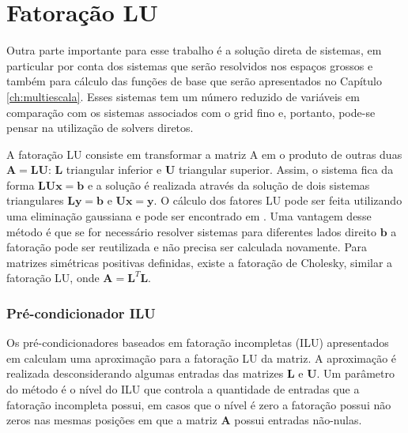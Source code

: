 \section{Fatoração LU} \label{sec:fatoracaolu}

Outra parte importante para esse trabalho é a solução direta de sistemas, em particular por conta dos sistemas que serão resolvidos nos espaços grossos e também para cálculo das funções de base que serão apresentados no Capítulo \ref{ch:multiescala}. Esses sistemas tem um número reduzido de variáveis em comparação com os sistemas associados com o grid fino e, portanto, pode-se pensar na utilização de solvers diretos.

A fatoração LU consiste em transformar a matriz A em o produto de outras duas $\mathbf{A}=\mathbf{L}\mathbf{U}$: $\mathbf{L}$ triangular inferior e $\mathbf{U}$ triangular superior. Assim, o sistema fica da forma $\mathbf{L} \mathbf{U} \mathbf{x} = \mathbf{b}$ e a solução é realizada através da solução de dois sistemas triangulares $\mathbf{L}\mathbf{y} = \mathbf{b}$ e $\mathbf{U}\mathbf{x} = \mathbf{y}$. O cálculo dos fatores LU pode ser feita utilizando uma eliminação gaussiana e pode ser encontrado em \citet{heath1997scientific}. Uma vantagem desse método é que se for necessário resolver sistemas para diferentes lados direito $\mathbf{b}$ a fatoração pode ser reutilizada e não precisa ser calculada novamente. Para matrizes simétricas positivas definidas, existe a fatoração de Cholesky, similar a fatoração LU, onde $\mathbf{A} = \mathbf{L}^T \mathbf{L}$.


\subsubsection{Pré-condicionador ILU}

Os pré-condicionadores baseados em fatoração incompletas (ILU) apresentados em \citet{ilupaper} calculam uma aproximação para a fatoração LU da matriz. A aproximação é realizada desconsiderando algumas entradas das matrizes $\mathbf{L}$ e $\mathbf{U}$. Um parâmetro do método é o nível do ILU que controla a quantidade de entradas que a fatoração incompleta possui, em casos que o nível é zero a fatoração possui não zeros nas mesmas posições em que a matriz $\mathbf{A}$ possui entradas não-nulas. 
